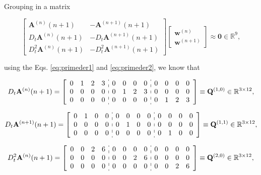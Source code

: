 Grouping in a matrix

\begin{equation}
\begin{bmatrix}
\mathbf{A}^{(n)}(n+1) & -\mathbf{A}^{(n+1)}(n+1)\\
D_{t}\mathbf{A}^{(n)}(n+1) & -D_{t}\mathbf{A}^{(n+1)}(n+1)\\
D_{t}^{2}\mathbf{A}^{(n)}(n+1) & -D_{t}^{2}\mathbf{A}^{(n+1)}(n+1)
\end{bmatrix}
\begin{bmatrix}
\mathbf{w}^{(n)}\\
\mathbf{w}^{(n+1)}
\end{bmatrix}
\approx\mathbf{0}\in \mathbb{R}^{9},
\end{equation}


using the Eqs. \ref{eq:primeder1} and \ref{eq:primeder2}, 
we know that

\begin{equation}\label{eq:Q10}
D_{t} \mathbf{A}^{(n)}(n+1)
=
\left[
\begin{array}{cccc:cccc:cccc}
0 & 1 & 2 & 3 &
0 & 0 & 0 & 0 &
0 & 0 & 0 & 0 \\
0 & 0 & 0 & 0 &
0 & 1 & 2 & 3 &
0 & 0 & 0 & 0 \\
0 & 0 & 0 & 0 &
0 & 0 & 0 & 0 &
0 & 1 & 2 & 3 
\end{array}
\right]
\equiv \mathbf{Q}^{(1,0)}\in \mathbb{R}^{3\times 12},
\end{equation}

\begin{equation}\label{eq:Q11}
D_{t} \mathbf{A}^{(n+1)}(n+1)
=
\left[
\begin{array}{cccc:cccc:cccc}
0 & 1 & 0 & 0 &
0 & 0 & 0 & 0 &
0 & 0 & 0 & 0 \\
0 & 0 & 0 & 0 &
0 & 1 & 0 & 0 &
0 & 0 & 0 & 0 \\
0 & 0 & 0 & 0 &
0 & 0 & 0 & 0 &
0 & 1 & 0 & 0 
\end{array}
\right]
\equiv \mathbf{Q}^{(1,1)}\in \mathbb{R}^{3\times 12},
\end{equation}

\begin{equation}\label{eq:Q20}
D_{t}^{2} \mathbf{A}^{(n)}(n+1)
=
\left[
\begin{array}{cccc:cccc:cccc}
0 & 0 & 2 & 6 &
0 & 0 & 0 & 0 &
0 & 0 & 0 & 0 \\
0 & 0 & 0 & 0 &
0 & 0 & 2 & 6 &
0 & 0 & 0 & 0 \\
0 & 0 & 0 & 0 &
0 & 0 & 0 & 0 &
0 & 0 & 2 & 6 
\end{array}
\right]
\equiv \mathbf{Q}^{(2,0)}\in \mathbb{R}^{3\times 12},
\end{equation}

